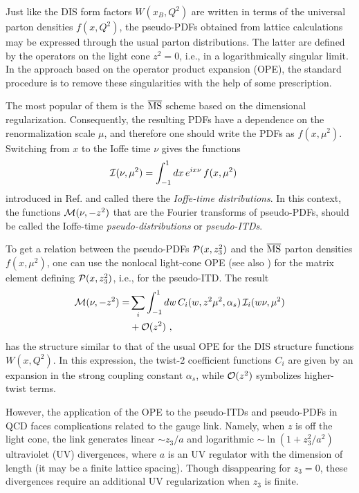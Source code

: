  Just like the  DIS  form factors  $W(x_B,Q^2)$ are
 written in terms of  the universal parton densities $f(x, Q^2)$,
 the pseudo-PDFs   obtained   from
lattice calculations   may  be expressed through  the usual
 parton distributions. The  latter are  defined by
 the operators on the light cone $z^2=0$, i.e., in a
 logarithmically  singular limit.
 In the approach based on  the operator product expansion
(OPE),  the standard procedure is to  remove  these singularities  with the help of some
 prescription.

 The most popular of them is the  $\overline{\rm MS}$  scheme based
on the dimensional  regularization.
 Consequently,  the resulting PDFs  have a dependence on the renormalization scale
$\mu$, and therefore one should write the PDFs as $   f(x, \mu^2)$.
Switching from $x$  to the Ioffe time $\nu$ gives  the functions
 \begin{align}
 {\cal I} (\nu, \mu^2)
&   =
 \int_{-1}^1 dx
 \, e^{i x \nu  } \,  f (x, \mu^2)  \
  \label{ITD}
\end{align}
introduced in Ref.  \cite{Braun:1994jq}  and  called there  the {\it Ioffe-time distributions}.
In this context, the
functions  ${\cal M}(\nu , -z^2) $   that are  the  Fourier transforms of
pseudo-PDFs,    should be called the  Ioffe-time {\it pseudo-distributions}
or {\it pseudo-ITDs}.



To get  a relation between the pseudo-PDFs ${\cal P} (x,z_3^2)$  and the
$\overline{\rm MS}$     parton densities $ f(x, \mu^2)$, one can use
 the  nonlocal  light-cone OPE \cite{Anikin:1978tj,Balitsky:1987bk}
 (see also \cite{Radyushkin:2017lvu})
for  the  matrix element defining
${\cal P} (x,z_3^2)$, i.e., for  the pseudo-ITD. The result
\begin{align}
{\cal M } (\nu, -z^2 ) =&  \sum_i  \int_{-1}^1 dw \, C_i (w, z^2 \mu ^2, \alpha_s) \,  {\cal I}_i (w \nu,\mu^2)
\nonumber \\  & + {\cal O} (z^2)
  \  ,
\label{OPE}
\end{align}
has the   structure  similar to that of the usual  OPE  for the DIS structure functions $W (x, Q^2)$.
In this expression,   the twist-2 coefficient functions $C_i$ are
given by an expansion in the strong coupling constant $\alpha_s$,
while  ${\cal O} (z^2) $ symbolizes  higher-twist terms.

However, the application of the OPE
to the pseudo-ITDs  and pseudo-PDFs   in QCD  faces
complications   related to the gauge link.  Namely, when $z$ is off the light cone,
the link  generates
linear $\sim z_3/a$ and logarithmic $\sim \ln (1+z_3^2/a^2)$  ultraviolet (UV) divergences,
where $a$ is an UV regulator with the dimension of length
(it may be a finite lattice  spacing).
Though
 disappearing  for $z_3=0$, these   divergences
require an additional UV  regularization when $z_3$ is finite.


